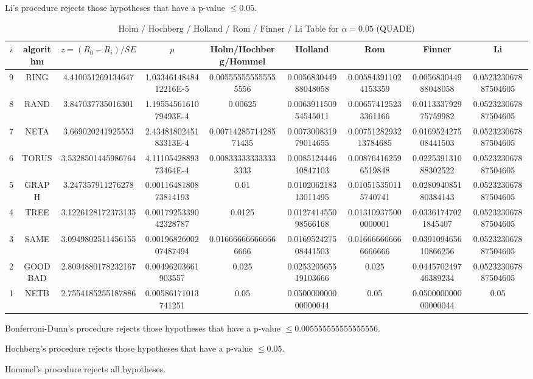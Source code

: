 \documentclass[a4paper,10pt]{article}
\begin{document}
\begin{landscape}
Li's procedure rejects those hypotheses that have a p-value $\le0.05$.



\newpage

\begin{table}[!htp]
\centering\scriptsize
\caption{Holm / Hochberg / Holland / Rom / Finner / Li Table for $\alpha=0.05$ (QUADE)}
\begin{tabular}{ccccccccc}
$i$&algorithm&$z=(R_0 - R_i)/SE$&$p$&Holm/Hochberg/Hommel&Holland&Rom&Finner&Li\\
\hline
9& RING&4.410051269134647&1.0334614848412216E-5&0.005555555555555556&0.005683044988048058&0.005843911024153359&0.005683044988048058&0.052323067887504605\\
8& RAND&3.847037735016301&1.1955456161079493E-4&0.00625&0.006391150954545011&0.006574125233361166&0.011333792975759982&0.052323067887504605\\
7& NETA&3.669020241925553&2.4348180245183313E-4&0.0071428571428571435&0.007300831979014655&0.0075128293213784685&0.016952427508441503&0.052323067887504605\\
6& TORUS&3.5328501445986764&4.1110542889373464E-4&0.008333333333333333&0.008512444610847103&0.008764162596519848&0.022539131088302522&0.052323067887504605\\
5& GRAPH&3.247357911276278&0.0011648180873814193&0.01&0.010206218313011495&0.010515350115740741&0.028094085180384143&0.052323067887504605\\
4& TREE&3.1226128172373135&0.0017925339042328787&0.0125&0.012741455098566168&0.013109375000000001&0.03361747021845407&0.052323067887504605\\
3& SAME&3.0949802511456155&0.0019682600207487494&0.016666666666666666&0.016952427508441503&0.016666666666666666&0.039109465610866256&0.052323067887504605\\
2& GOODBAD&2.8094880178232167&0.00496203661903557&0.025&0.025320565519103666&0.025&0.044570249746389234&0.052323067887504605\\
1& NETB&2.7554185255187886&0.00586171013741251&0.05&0.050000000000000044&0.05&0.050000000000000044&0.05\\
\hline
\end{tabular}
\end{table}
Bonferroni-Dunn's procedure rejects those hypotheses that have a p-value $\le0.005555555555555556$.


Hochberg's procedure rejects those hypotheses that have a p-value $\le0.05$.


Hommel's procedure rejects all hypotheses.



\end{landscape}
\end{document}
